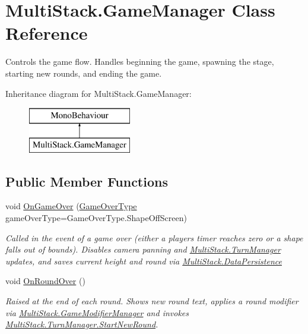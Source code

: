 \hypertarget{class_multi_stack_1_1_game_manager}{}\section{Multi\+Stack.\+Game\+Manager Class Reference}
\label{class_multi_stack_1_1_game_manager}


Controls the game flow. Handles beginning the game, spawning the stage, starting new rounds, and ending the game.  


Inheritance diagram for Multi\+Stack.\+Game\+Manager\+:\begin{figure}[H]
\begin{center}
\leavevmode
\includegraphics[height=2.000000cm]{class_multi_stack_1_1_game_manager}
\end{center}
\end{figure}
\subsection*{Public Member Functions}
\begin{DoxyCompactItemize}
\item 
void \hyperlink{class_multi_stack_1_1_game_manager_a8c599ec14abfba5712e9631a00d4ec59}{On\+Game\+Over} (\hyperlink{namespace_multi_stack_a19d387de624d6945620427c53c4f0c10}{Game\+Over\+Type} game\+Over\+Type=Game\+Over\+Type.\+Shape\+Off\+Screen)
\begin{DoxyCompactList}\small\item\em Called in the event of a game over (either a players timer reaches zero or a shape falls out of bounds). Disables camera panning and \hyperlink{class_multi_stack_1_1_turn_manager}{Multi\+Stack.\+Turn\+Manager} updates, and saves current height and round via \hyperlink{class_multi_stack_1_1_data_persistence}{Multi\+Stack.\+Data\+Persistence} \end{DoxyCompactList}\item 
void \hyperlink{class_multi_stack_1_1_game_manager_aa8e72d64791c9e4db6815341488110fd}{On\+Round\+Over} ()
\begin{DoxyCompactList}\small\item\em Raised at the end of each round. Shows new round text, applies a round modifier via \hyperlink{class_multi_stack_1_1_game_modifier_manager}{Multi\+Stack.\+Game\+Modifier\+Manager} and invokes \hyperlink{class_multi_stack_1_1_turn_manager_ae7cb8bf242a4c9cc7285be6aa8d3efb8}{Multi\+Stack.\+Turn\+Manager.\+Start\+New\+Round}. \end{DoxyCompactList}\end{DoxyCompactItemize}
